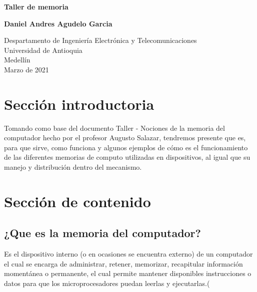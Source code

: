 \documentclass{article}
\begin{document}
\begin{titlepage}
    \begin{center}
        \vspace*{1cm}
            
        \Huge
        \textbf{Taller de memoria}
            
        \vspace{0.5cm}
        \LARGE
            
        \vspace{1.5cm}
            
        \textbf{Daniel Andres Agudelo Garcia}
            
        \vfill
            
        \vspace{0.8cm}
            
        \Large
        Despartamento de Ingeniería Electrónica y Telecomunicaciones\\
        Universidad de Antioquia\\
        Medellín\\
        Marzo de 2021
            
    \end{center}
\end{titlepage}

\tableofcontents

\vspace{13cm}

\section{Sección introductoria}
Tomando como base del documento Taller - Nociones de la memoria del computador hecho por el profesor Augusto Salazar, tendremos presente que es, para que sirve, como funciona y algunos ejemplos de  cómo es el funcionamiento de las diferentes memorias de computo utilizadas en dispositivos, al igual que su manejo y distribución dentro del mecanismo. \cite{profe}

\vspace{14cm}

\section{Sección de contenido} \label{contenido}
\subsection{¿Que es la memoria del computador?}
Es el dispositivo interno (o en ocasiones se encuentra externo) de un computador el cual se encarga de administrar, retener, memorizar, recapitular información momentánea o permanente, el cual permite mantener disponibles instrucciones o datos para que los microprocesadores puedan leerlas y ejecutarlas.(
\end{document}
